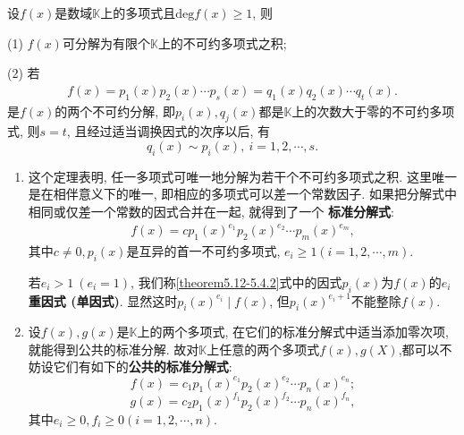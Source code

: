 \documentclass[../../main.tex]{subfiles}%
\begin{document}
\begin{theorem}[因式分解定理]\label{theorem:因式分解定理}
设\(f(x)\)是数域\(\mathbb{K}\)上的多项式且\(\mathrm{deg }f(x)\geqslant  1\), 则

(1) \(f(x)\)可分解为有限个\(\mathbb{K}\)上的不可约多项式之积;

(2) 若
\begin{align}
f(x)=p_1(x)p_2(x)\cdots p_s(x)=q_1(x)q_2(x)\cdots q_t(x).\label{theorem5.12-5.4.1}
\end{align}
是\(f(x)\)的两个不可约分解, 即\(p_i(x),q_j(x)\)都是\(\mathbb{K}\)上的次数大于零的不可约多项式, 则\(s = t\), 且经过适当调换因式的次序以后, 有
\[
q_i(x)\sim p_i(x),\ i = 1,2,\cdots,s.
\]
\end{theorem}
\begin{note}
\begin{enumerate}
\item 这个定理表明, 任一多项式可唯一地分解为若干个不可约多项式之积. 这里唯一是在相伴意义下的唯一, 即相应的多项式可以差一个常数因子. 如果把分解式中相同或仅差一个常数的因式合并在一起, 就得到了一个 \textbf{标准分解式}:
\begin{align}
f(x)=cp_1(x)^{e_1}p_2(x)^{e_2}\cdots p_m(x)^{e_m}, \label{theorem5.12-5.4.2}
\end{align}
其中\(c\neq 0, p_i(x)\)是互异的首一不可约多项式, \(e_i\geqslant  1(i = 1,2,\cdots,m)\).

若\(e_i>1\ (e_i = 1)\), 我们称\eqref{theorem5.12-5.4.2}式中的因式\(p_i(x)\)为\(f(x)\)的\textbf{\(e_i\)重因式 (单因式)}. 显然这时\(p_i(x)^{e_i}\mid f(x)\), 但\(p_i(x)^{e_i + 1}\)不能整除\(f(x)\).

\item 设\(f(x),g(x)\)是\(\mathbb{K}\)上的两个多项式, 在它们的标准分解式中适当添加零次项,就能得到公共的标准分解. 故对\(\mathbb{K}\)上任意的两个多项式$f(x),g(X)$,都可以不妨设它们有如下的\textbf{公共的标准分解式}:
\[
f(x)=c_1p_1(x)^{e_1}p_2(x)^{e_2}\cdots p_n(x)^{e_n};
\]
\[
g(x)=c_2p_1(x)^{f_1}p_2(x)^{f_2}\cdots p_n(x)^{f_n},
\]
其中\(e_i\geqslant  0, f_i\geqslant  0(i = 1,2,\cdots,n)\).
\end{enumerate}
\end{note}
\end{document}
